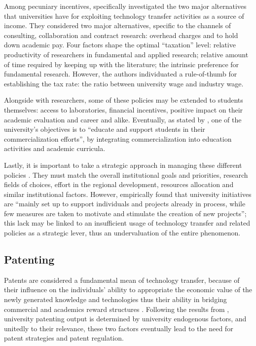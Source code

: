 Among pecuniary incentives, \citet{Beath2000} specifically investigated the two major alternatives that universities have for exploiting technology transfer activities as a source of income. They considered two major alternatives, specific to the channels of consulting, collaboration and contract research: overhead charges and to hold down academic pay. Four factors shape the optimal \enquote{taxation} level: relative productivity of researchers in fundamental and applied research; relative amount of time required by keeping up with the literature; the intrinsic preference for fundamental research. However, the authors individuated a rule-of-thumb for establishing the tax rate: the ratio between university wage and industry wage.

Alongside with researchers, some of these policies may be extended to students themselves: access to laboratories, financial incentives, positive impact on their academic evaluation and career and alike. Eventually, as stated by \citet{Rasmussen2006}, one of the university's objectives is to \enquote{educate and support students in their commercialization efforts}, by integrating commercialization into education activities and academic curricula. 

Lastly, it is important to take a strategic approach in managing these different policies \citep{Siegel2007}. They must match the overall institutional goals and priorities, research fields of choices, effort in the regional development, resources allocation and similar institutional factors. However, \citet{Rasmussen2006} empirically found that university initiatives are \enquote{mainly set up to support individuals and projects already in process, while few measures are taken to motivate and stimulate the creation of new projects}; this lack may be linked to an insufficient usage of technology transfer and related policies as a strategic lever, thus an undervaluation of the entire phenomenon.

\subsection{Patenting}

Patents are considered a fundamental mean of technology transfer, because of their influence on the individuals' ability to appropriate the economic value of the newly generated knowledge and technologies \citep{Bercovitz2006} thus their ability in bridging commercial and academics reward structures \citep{OwenSmith2001}. Following the results from \citet{Tijssen2006}, university patenting output is determined by university endogenous factors, and unitedly to their relevance, these two factors eventually lead to the need for patent strategies \citep{Siegel2007} and patent regulation.

